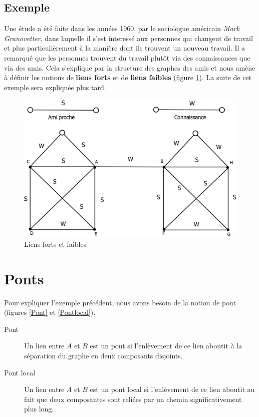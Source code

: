 \subsection*{Exemple}
Une étude a été faite dans les années 1960, par le sociologue américain \textit{Mark Granovetter}, dans laquelle il s'est interessé aux personnes qui changent de travail et plus particulièrement à la manière dont ils trouvent un nouveau travail. Il a remarqué que les personnes trouvent du travail plutôt via des connaissances que via des amis. Cela s'explique par la structure des graphes des amis et nous amène à définir les notions de \textbf{liens forts} et de \textbf{liens faibles} (figure \ref{liens_forts_et_faibles}). La suite de cet exemple sera expliquée plus tard.\\
	\begin{figure}[!h]
	\center
	\includegraphics[scale=0.4]{images/18_liens_forts_et_faibles.png}
	\caption{\label{liens_forts_et_faibles} Liens forts et faibles}
	\end{figure}

    
\section{Ponts}
Pour expliquer l'exemple précédent, nous avons besoin de la notion de pont (figures \ref{Pont} et \ref{Pontlocal}).
	\begin{description}
	\item[Pont] Un lien entre $A$ et $B$ est un pont si l'enlèvement de ce lien aboutit à la séparation du graphe en deux composants disjoints.
    \item[Pont local] Un lien entre $A$ et $B$ est un pont local si l'enlèvement de ce lien aboutit au fait que deux composantes sont reliées par un chemin significativement plus long.
    \end{description}
    
